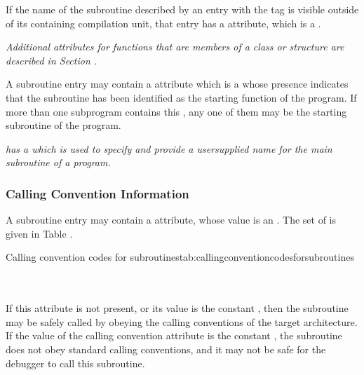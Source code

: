 If the name of the subroutine described by an entry with the
tag \DWTAGsubprogram{}
is visible outside of its containing
\hypertarget{chap:DWATexternalexternalsubroutine}{}
compilation unit, that entry has 
a 
\DWATexternalDEFN{} attribute,
which is a .

\textit{Additional attributes for functions that are members of a
class or structure are described in 
Section .
}

A 
\hypertarget{chap:DWATmainsubprogrammainorstartingsubprogram}{}
subroutine entry 
may contain a 
\DWATmainsubprogramDEFN{}
attribute 
which is 
a \CLASSflag{} whose presence indicates that the
subroutine has been identified as the starting function of
the program.  If more than one subprogram contains this 
,
any one of them may be the starting subroutine of the program.

\textit{ has a  
which is used to specify
and provide a user\dash supplied name for the main subroutine of
a program.
}

\subsubsection{Calling Convention Information}
A subroutine entry may 
\hypertarget{chap:DWATcallingconventionforsubprograms}{}
contain a 
\DWATcallingconventionDEFN{}
attribute, whose value is an 
. The set of
is given in Table .

\begin{simplenametable}[1.4in]{Calling convention codes for subroutines}{tab:callingconventioncodesforsubroutines}
\DWCCnormal        \\
\DWCCprogram       \\
\DWCCnocall        \\
\end{simplenametable}

If this attribute is not present, or its value is the constant
\DWCCnormalTARG, then the subroutine may be safely called by
obeying the  calling conventions of the target
architecture. If the value of the calling convention attribute
is the constant \DWCCnocallTARG, the subroutine does not obey
standard calling conventions, and it may not be safe for the
debugger to call this subroutine.


